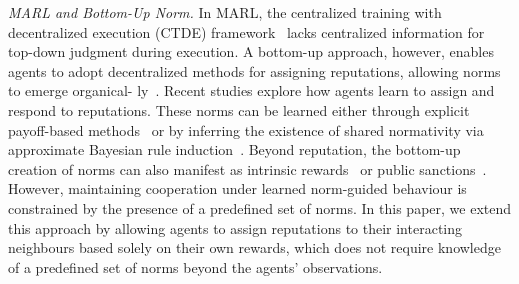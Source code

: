 \textit{MARL and Bottom-Up Norm.} In MARL, the centralized training with decentralized execution (CTDE) framework~\cite{lowe2017multi} lacks centralized information for top-down judgment during execution. A bottom-up approach, however, enables agents to adopt decentralized methods for assigning reputations, allowing norms to emerge organical- ly~\cite{xu2019cooperation}. Recent studies explore how agents learn to assign and respond to reputations. These norms can be learned either through explicit payoff-based methods~\cite{xu2019cooperation} or by inferring the existence of shared normativity via approximate Bayesian rule induction~\cite{oldenburg2024learning}. Beyond reputation, the bottom-up creation of norms can also manifest as intrinsic rewards~\cite{mckee2021multi} or public sanctions~\cite{vinitsky2023learning}. However, maintaining cooperation under learned norm-guided behaviour is constrained by the presence of a predefined set of norms. In this paper, we extend this approach by allowing agents to assign reputations to their interacting neighbours based solely on their own rewards, which does not require knowledge of a predefined set of norms beyond the agents' observations.